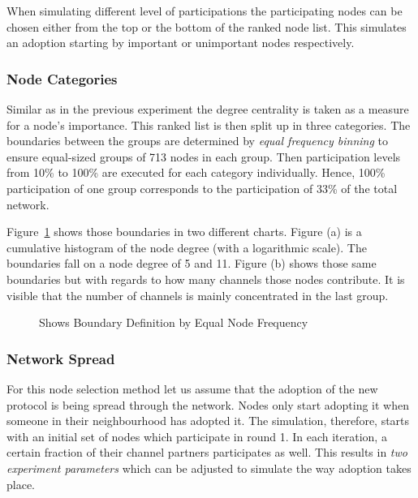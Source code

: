 \documentclass[final]{fhnwreport}       %
\begin{document}
When simulating different level of participations the participating nodes can be chosen either from the top or the bottom of the ranked node list. This simulates an adoption starting by important or unimportant nodes respectively. 

\subsubsection{Node Categories}\label{subsub:categ}
Similar as in the previous experiment the degree centrality is taken as a measure for a node's importance. This ranked list is then split up in three categories. The boundaries between the groups are determined by \emph{equal frequency binning} to ensure equal-sized groups of 713 nodes in each group. Then participation levels from 10\% to 100\% are executed for each category individually. Hence, 100\% participation of one group corresponds to the participation of 33\% of the total network. 

Figure~\ref{fig:eqfreq} shows those boundaries in two different charts. Figure (a) is a cumulative histogram of the node degree (with a logarithmic scale). The boundaries fall on a node degree of 5 and 11. Figure (b) shows those same boundaries but with regards to how many channels those nodes contribute. It is visible that the number of channels is mainly concentrated in the last group. 

\begin{figure}[H]
\centering
{}\quad
{}
\caption{Shows Boundary Definition by Equal Node Frequency}
\label{fig:eqfreq}
\end{figure}

\subsubsection{Network Spread}
For this node selection method let us assume that the adoption of the new protocol is being spread through the network. Nodes only start adopting it when someone in their neighbourhood has adopted it. The simulation, therefore, starts with an initial set of nodes which participate in round 1. In each iteration, a certain fraction of their channel partners participates as well. This results in \emph{two experiment parameters} which can be adjusted to simulate the way adoption takes place. 
\end{document}
